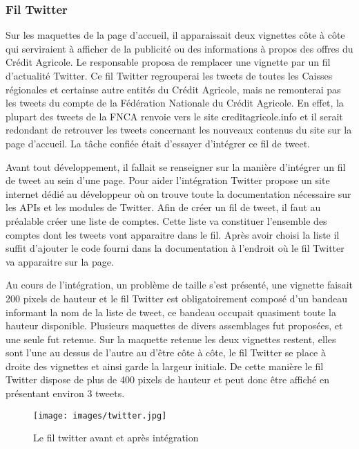 \documentclass[12pt,a4paper]{article}
\begin{document}
\subsubsection{Fil Twitter}
Sur les maquettes de la page d'accueil, il apparaissait deux vignettes côte à côte qui serviraient à afficher de la publicité ou des informations à propos des offres du Crédit Agricole. Le responsable proposa de remplacer une vignette par un fil d'actualité Twitter. Ce fil Twitter regrouperai les tweets de toutes les Caisses régionales et certainse autre entités du Crédit Agricole, mais ne remonterai pas les tweets du compte de la Fédération Nationale du Crédit Agricole. En effet, la plupart des tweets de la FNCA renvoie vers le site creditagricole.info et il serait redondant de retrouver les tweets concernant les nouveaux contenus du site sur la page d'accueil. La tâche confiée était d'essayer d'intégrer ce fil de tweet.\par
\medskip
Avant tout développement, il fallait se renseigner sur la manière d'intégrer un fil de tweet au sein d'une page. Pour aider l'intégration Twitter propose un site internet dédié au développeur où on trouve toute la documentation nécessaire sur les APIs et les modules de Twitter. Afin de créer un fil de tweet, il faut au préalable créer une liste de comptes. Cette liste va constituer l'ensemble des comptes dont les tweets vont apparaitre dans le fil. Après avoir choisi la liste il suffit d'ajouter le code fourni dans la documentation à l'endroit où le fil Twitter va apparaitre sur la page.\par
\medskip
Au cours de l'intégration, un problème de taille s'est présenté, une vignette faisait 200 pixels de hauteur et le fil Twitter est obligatoirement composé d'un bandeau informant la nom de la liste de tweet, ce bandeau occupait quasiment toute la hauteur disponible. Plusieurs maquettes de divers assemblages fut proposées, et une seule fut retenue. Sur la maquette retenue les deux vignettes restent, elles sont l'une au dessus de l'autre au d'être côte à côte, le fil Twitter se place à droite des vignettes et ainsi garde la largeur initiale. De cette manière le fil Twitter dispose de plus de 400 pixels de hauteur et peut donc être affiché en présentant environ 3 tweets.\par 

\begin{figure}[h!]
\centering\texttt{[image: images/twitter.jpg]} 
\caption{Le fil twitter avant et après intégration}
\end{figure}
\newpage
\end{document}
